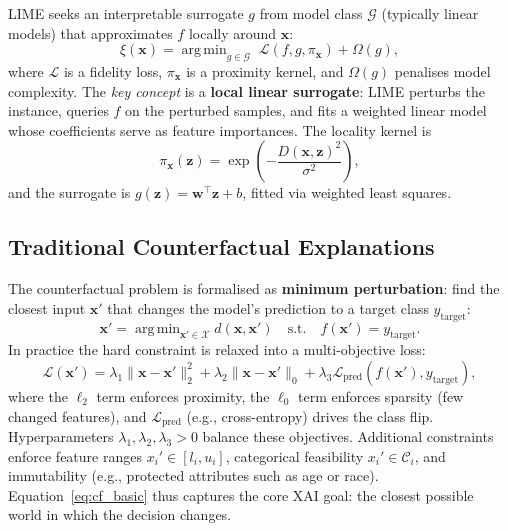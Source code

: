 \documentclass[conference]{IEEEtran}
\newcommand{\Xspace}{\mathcal{X}}
\newcommand{\bx}{\mathbf{x}}
\newcommand{\bxp}{\mathbf{x}'}
\newcommand{\bw}{\mathbf{w}}
\DeclareMathOperator*{\argmin}{arg\,min}
\begin{document}
LIME seeks an interpretable surrogate $g$ from model class $\mathcal{G}$
(typically linear models) that approximates $f$ locally around $\bx$:
\begin{equation}
\xi(\bx) = \argmin_{g \in \mathcal{G}}\;
  \mathcal{L}(f, g, \pi_{\bx}) + \Omega(g),
\label{eq:lime}
\end{equation}
where $\mathcal{L}$ is a fidelity loss, $\pi_{\bx}$ is a proximity kernel, and
$\Omega(g)$ penalises model complexity. The \emph{key concept} is a
\textbf{local linear surrogate}: LIME perturbs the instance, queries $f$ on the
perturbed samples, and fits a weighted linear model whose coefficients serve as
feature importances. The locality kernel is
\begin{equation}
\pi_{\bx}(\mathbf{z}) = \exp\!\left(-\frac{D(\bx,\mathbf{z})^2}{\sigma^2}\right),
\label{eq:lime_kernel}
\end{equation}
and the surrogate is $g(\mathbf{z}) = \bw^\top\mathbf{z} + b$, fitted via
weighted least squares.

\subsection{Traditional Counterfactual Explanations}

The counterfactual problem is formalised as \textbf{minimum perturbation}: find
the closest input $\bxp$ that changes the model's prediction to a target class
$y_\text{target}$:
\begin{equation}
\bxp = \argmin_{\bxp \in \Xspace} d(\bx,\bxp)
  \quad\text{s.t.}\quad f(\bxp) = y_\text{target}.
\label{eq:cf_basic}
\end{equation}
In practice the hard constraint is relaxed into a multi-objective loss:
\begin{equation}
\mathcal{L}(\bxp) =
  \lambda_1 \|\bx-\bxp\|_2^2
  + \lambda_2 \|\bx-\bxp\|_0
  + \lambda_3 \mathcal{L}_\text{pred}(f(\bxp), y_\text{target}),
\label{eq:cf_loss}
\end{equation}
where the $\ell_2$ term enforces proximity, the $\ell_0$ term enforces sparsity
(few changed features), and $\mathcal{L}_\text{pred}$ (e.g., cross-entropy)
drives the class flip. Hyperparameters $\lambda_1,\lambda_2,\lambda_3 > 0$
balance these objectives. Additional constraints enforce feature ranges
$x_i' \in [l_i, u_i]$, categorical feasibility $x_i' \in \mathcal{C}_i$, and
immutability (e.g., protected attributes such as age or race). Equation~\eqref{eq:cf_basic}
thus captures the core XAI goal: the closest possible world in which the
decision changes.
\end{document}
